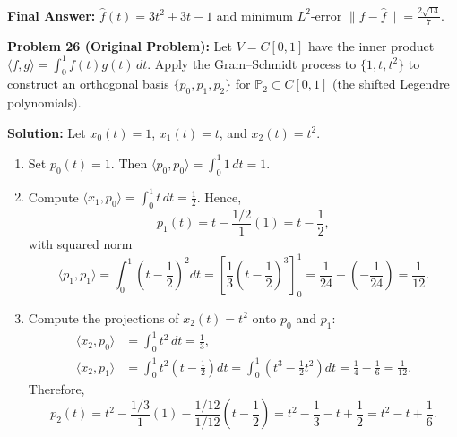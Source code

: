 \documentclass[11pt, letterpaper]{article}
\theoremstyle{definition}
\theoremstyle{remark}
\begin{document}
\textbf{Final Answer:} $\hat{f}(t) = 3t^2 + 3t - 1$ and minimum $L^2$-error $\|f - \hat{f}\| = \frac{2\sqrt{14}}{7}$.

\medskip

\textbf{Problem 26 (Original Problem):} Let $V = C[0, 1]$ have the inner product $\langle f, g \rangle = \int_0^1 f(t)g(t)\,dt$. Apply the Gram--Schmidt process to $\{1, t, t^2\}$ to construct an orthogonal basis $\{p_0, p_1, p_2\}$ for $\mathbb{P}_2 \subset C[0, 1]$ (the shifted Legendre polynomials).

\textbf{Solution:} Let $x_0(t) = 1$, $x_1(t) = t$, and $x_2(t) = t^2$.
\begin{enumerate}
    \item Set $p_0(t) = 1$. Then $\langle p_0, p_0 \rangle = \int_0^1 1\,dt = 1$.
    \item Compute $\langle x_1, p_0 \rangle = \int_0^1 t\,dt = \frac{1}{2}$. Hence,
    \[
    p_1(t) = t - \frac{1/2}{1}(1) = t - \frac{1}{2},
    \]
    with squared norm
    \[
    \langle p_1, p_1 \rangle = \int_0^1 \left(t - \frac{1}{2}\right)^2 dt = \left[\frac{1}{3}\left(t - \frac{1}{2}\right)^3\right]_0^1 = \frac{1}{24} - \left(-\frac{1}{24}\right) = \frac{1}{12}.
    \]
    \item Compute the projections of $x_2(t) = t^2$ onto $p_0$ and $p_1$:
    \begin{align*}
    \langle x_2, p_0 \rangle &= \int_0^1 t^2\,dt = \frac{1}{3}, \\
    \langle x_2, p_1 \rangle &= \int_0^1 t^2\left(t - \frac{1}{2}\right) dt = \int_0^1 \left(t^3 - \frac{1}{2}t^2\right) dt = \frac{1}{4} - \frac{1}{6} = \frac{1}{12}.
    \end{align*}
    Therefore,
    \[
    p_2(t) = t^2 - \frac{1/3}{1}(1) - \frac{1/12}{1/12}\left(t - \frac{1}{2}\right) = t^2 - \frac{1}{3} - t + \frac{1}{2} = t^2 - t + \frac{1}{6}.
    \]
\end{enumerate}
\end{document}

